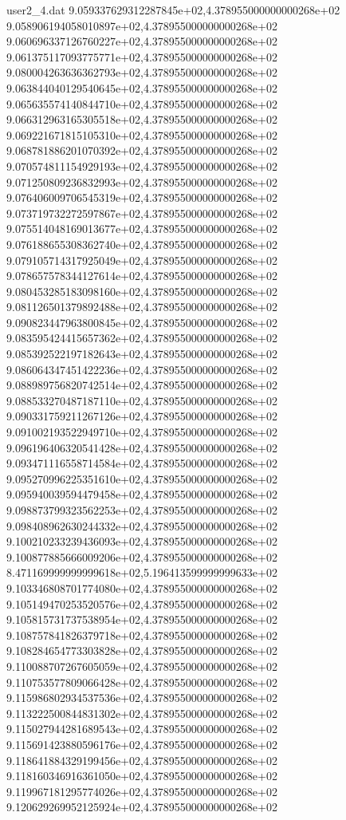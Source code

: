 \begin{filecontents}{user2_4.dat}
9.059337629312287845e+02,4.378955000000000268e+02
9.058906194058010897e+02,4.378955000000000268e+02
9.060696337126760227e+02,4.378955000000000268e+02
9.061375117093775771e+02,4.378955000000000268e+02
9.080004263636362793e+02,4.378955000000000268e+02
9.063844040129540645e+02,4.378955000000000268e+02
9.065635574140844710e+02,4.378955000000000268e+02
9.066312963165305518e+02,4.378955000000000268e+02
9.069221671815105310e+02,4.378955000000000268e+02
9.068781886201070392e+02,4.378955000000000268e+02
9.070574811154929193e+02,4.378955000000000268e+02
9.071250809236832993e+02,4.378955000000000268e+02
9.076406009706545319e+02,4.378955000000000268e+02
9.073719732272597867e+02,4.378955000000000268e+02
9.075514048169013677e+02,4.378955000000000268e+02
9.076188655308362740e+02,4.378955000000000268e+02
9.079105714317925049e+02,4.378955000000000268e+02
9.078657578344127614e+02,4.378955000000000268e+02
9.080453285183098160e+02,4.378955000000000268e+02
9.081126501379892488e+02,4.378955000000000268e+02
9.090823447963800845e+02,4.378955000000000268e+02
9.083595424415657362e+02,4.378955000000000268e+02
9.085392522197182643e+02,4.378955000000000268e+02
9.086064347451422236e+02,4.378955000000000268e+02
9.088989756820742514e+02,4.378955000000000268e+02
9.088533270487187110e+02,4.378955000000000268e+02
9.090331759211267126e+02,4.378955000000000268e+02
9.091002193522949710e+02,4.378955000000000268e+02
9.096196406320541428e+02,4.378955000000000268e+02
9.093471116558714584e+02,4.378955000000000268e+02
9.095270996225351610e+02,4.378955000000000268e+02
9.095940039594479458e+02,4.378955000000000268e+02
9.098873799323562253e+02,4.378955000000000268e+02
9.098408962630244332e+02,4.378955000000000268e+02
9.100210233239436093e+02,4.378955000000000268e+02
9.100877885666009206e+02,4.378955000000000268e+02
8.471169999999999618e+02,5.196413599999999633e+02
9.103346808701774080e+02,4.378955000000000268e+02
9.105149470253520576e+02,4.378955000000000268e+02
9.105815731737538954e+02,4.378955000000000268e+02
9.108757841826379718e+02,4.378955000000000268e+02
9.108284654773303828e+02,4.378955000000000268e+02
9.110088707267605059e+02,4.378955000000000268e+02
9.110753577809066428e+02,4.378955000000000268e+02
9.115986802934537536e+02,4.378955000000000268e+02
9.113222500844831302e+02,4.378955000000000268e+02
9.115027944281689543e+02,4.378955000000000268e+02
9.115691423880596176e+02,4.378955000000000268e+02
9.118641884329199456e+02,4.378955000000000268e+02
9.118160346916361050e+02,4.378955000000000268e+02
9.119967181295774026e+02,4.378955000000000268e+02
9.120629269952125924e+02,4.378955000000000268e+02

\end{filecontents}
